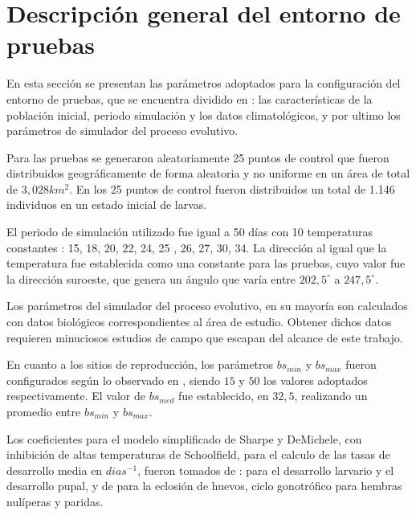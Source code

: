 \section{Descripción general del entorno de pruebas}
En esta sección se presentan las parámetros adoptados para la configuración del entorno de
pruebas, que se encuentra dividido en : las características de la población inicial, periodo
simulación y los datos climatológicos, y por ultimo los parámetros de simulador del proceso
evolutivo.

Para las pruebas se generaron aleatoriamente 25 puntos de control que fueron distribuidos
geográficamente de forma aleatoria y no uniforme en un área de total de $3,028 km^{2}$. En los 25 puntos de control fueron distribuidos un total de 1.146 individuos en un estado inicial de larvas.


El periodo de simulación utilizado fue igual a 50 días con 10 temperaturas constantes :
15\textcelsius , 18\textcelsius , 20\textcelsius , 22\textcelsius , 24\textcelsius , 25\textcelsius
, 26\textcelsius , 27\textcelsius , 30\textcelsius , 34\textcelsius. La dirección al igual que la
temperatura fue establecida como una constante para las pruebas, cuyo valor fue la dirección
suroeste, que genera un ángulo que varía entre $202,5^{\circ}$ a $247,5^{\circ}$.

Los parámetros del simulador del proceso evolutivo, en su mayoría son calculados con datos
biológicos correspondientes al área de estudio. Obtener dichos datos requieren minuciosos estudios
de campo que escapan del alcance de este trabajo.

En cuanto a los sitios de reproducción, los parámetros $bs_{min}$ y $bs_{max}$ fueron
configurados según lo observado en \cite{otero2006stochastic, otero2008stochastic}, siendo $15$ y
$50$ los valores adoptados respectivamente.  El valor de $bs_{med}$ fue establecido, en $32,5$,
realizando un promedio entre $bs_{min}$ y $bs_{max}$.

Los coeficientes para el modelo simplificado de Sharpe y DeMichele, con inhibición de altas
temperaturas de Schoolfield, para el calculo de las tasas de desarrollo media en $dias^{-1}$,
fueron tomados de :  \cite{rueda1990temperature} para el desarrollo larvario y el desarrollo
pupal, y de  \cite{otero2006stochastic} para la eclosión de huevos, ciclo gonotrófico para hembras
nulíperas y paridas.

